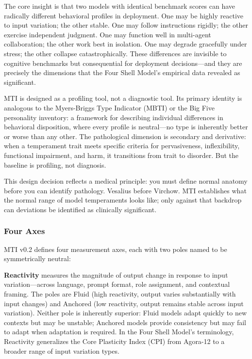 \documentclass[11pt]{article}
\begin{document}
The core insight is that two models with identical benchmark scores can have radically different behavioral profiles in deployment. One may be highly reactive to input variation; the other stable. One may follow instructions rigidly; the other exercise independent judgment. One may function well in multi-agent collaboration; the other work best in isolation. One may degrade gracefully under stress; the other collapse catastrophically. These differences are invisible to cognitive benchmarks but consequential for deployment decisions---and they are precisely the dimensions that the Four Shell Model's empirical data revealed as significant.

MTI is designed as a profiling tool, not a diagnostic tool. Its primary identity is analogous to the Myers-Briggs Type Indicator (MBTI) or the Big Five personality inventory: a framework for describing individual differences in behavioral disposition, where every profile is neutral---no type is inherently better or worse than any other. The pathological dimension is secondary and derivative: when a temperament trait meets specific criteria for pervasiveness, inflexibility, functional impairment, and harm, it transitions from trait to disorder. But the baseline is profiling, not diagnosis.

This design decision reflects a medical principle: you must define normal anatomy before you can identify pathology. Vesalius before Virchow. MTI establishes what the normal range of model temperaments looks like; only against that backdrop can deviations be identified as clinically significant.

\subsubsection{Four Axes}

MTI v0.2 defines four measurement axes, each with two poles named to be symmetrically neutral:

\textbf{Reactivity} measures the magnitude of output change in response to input variation---across language, prompt format, role assignment, and contextual framing. The poles are Fluid (high reactivity, output varies substantially with input changes) and Anchored (low reactivity, output remains stable across input variation). Neither pole is inherently superior: Fluid models adapt quickly to new contexts but may be unstable; Anchored models provide consistency but may fail to adapt when adaptation is required. In the Four Shell Model's terminology, Reactivity generalizes the Core Plasticity Index (CPI) from Agora-12 to a broader range of input variation types.
\end{document}
